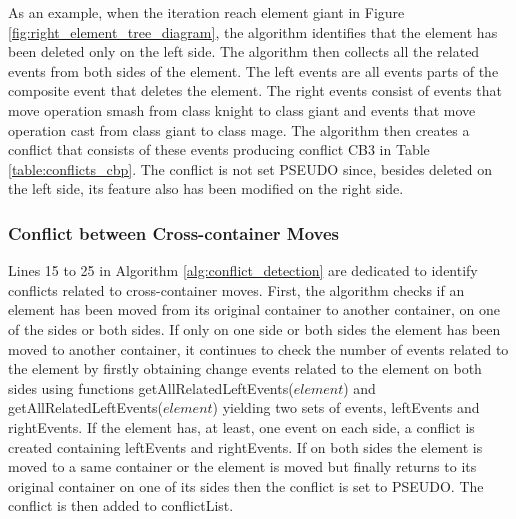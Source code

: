 As an example, when the iteration reach element \textsf{giant} in Figure \ref{fig:right_element_tree_diagram}, the algorithm identifies that the element has been deleted only on the left side.
The algorithm then collects all the related events from both sides of the element. 
The left events are all events parts of the composite event that deletes the element. 
The right events consist of events that move operation \textsf{smash} from class \textsf{knight} to class \textsf{giant} and events that
move operation \textsf{cast} from class \textsf{giant} to class \textsf{mage}. The algorithm then creates a conflict that consists of these events 
producing conflict \textsf{CB3} in Table \ref{table:conflicts_cbp}. The conflict is not set \textsf{PSEUDO} since, besides deleted on the left side, its feature also has been modified on the right side. 

\subsubsection{Conflict between Cross-container Moves} 
\label{sec:move_conflict} 
Lines 15 to 25 in Algorithm \ref{alg:conflict_detection} are dedicated to identify conflicts related to cross-container moves. 
First, the algorithm checks if an element has been moved from its original container to another container, on one of the sides or both sides. 
If only on one side or both sides the element has been moved to another container, 
it continues to check the number of events related to the element by firstly obtaining change events related to the element on 
both sides using functions \textsf{getAllRelatedLeftEvents($element$)} and \textsf{getAllRelatedLeftEvents($element$)} yielding two sets of events, 
\textsf{leftEvents} and \textsf{rightEvents}. If the element has, at least, one event on each side,
a conflict is created containing \textsf{leftEvents} and \textsf{rightEvents}. 
If on both sides the element is moved to a same container or the element is moved but finally returns to its original container on one of its sides then the conflict is set to \textsf{PSEUDO}. The conflict is then added to \textsf{conflictList}. 

